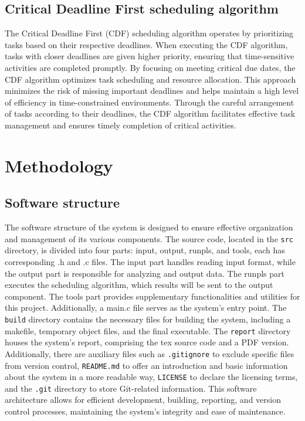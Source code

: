 \documentclass{ieeeaccess}
\begin{document}
\subsection{Critical Deadline First scheduling algorithm}
The Critical Deadline First (CDF) scheduling algorithm operates by prioritizing tasks based on their respective deadlines. When executing the CDF algorithm, tasks with closer deadlines are given higher priority, ensuring that time-sensitive activities are completed promptly. By focusing on meeting critical due dates, the CDF algorithm optimizes task scheduling and resource allocation. This approach minimizes the risk of missing important deadlines and helps maintain a high level of efficiency in time-constrained environments. Through the careful arrangement of tasks according to their deadlines, the CDF algorithm facilitates effective task management and ensures timely completion of critical activities.

\section{Methodology}

\subsection{Software structure}
The software structure of the system is designed to ensure effective organization and management of its various components. The source code, located in the \texttt{src} directory, is divided into four parts: input, output, runpls, and tools, each has corresponding .h and .c files. The input part handles reading input format, while the output part is responsible for analyzing and output data. The runpls part executes the scheduling algorithm, which results will be sent to the output component. The tools part provides supplementary functionalities and utilities for this project. Additionally, a main.c file serves as the system's entry point. The \texttt{build} directory contains the necessary files for building the system, including a makefile, temporary object files, and the final executable. The \texttt{report} directory houses the system's report, comprising the tex source code and a PDF version. Additionally, there are auxiliary files such as \texttt{.gitignore} to exclude specific files from version control, \texttt{README.md} to offer an introduction and basic information about the system in a more readable way, \texttt{LICENSE} to declare the licensing terms, and the \texttt{.git} directory to store Git-related information. This software architecture allows for efficient development, building, reporting, and version control processes, maintaining the system's integrity and ease of maintenance.
\end{document}
